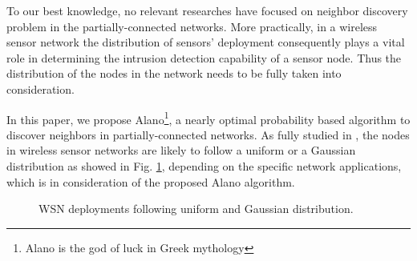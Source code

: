 To our best knowledge, no relevant researches have focused on neighbor discovery problem
in the partially-connected networks. More practically, in a wireless sensor network the distribution of 
sensors' deployment consequently plays a vital role in determining the intrusion detection capability of a sensor node.
Thus the distribution of the nodes in the network needs to be fully taken into 
consideration.

In this paper, we propose Alano\footnote{Alano is the god of luck in Greek mythology }, 
a nearly optimal probability based algorithm to discover neighbors in partially-connected networks. 
As fully studied in \cite{wang2013gaussian} , the nodes in wireless sensor networks are likely to 
follow a uniform or a Gaussian distribution as showed in Fig. \ref{distribution}, 
depending on the specific network applications, which is  in consideration of the proposed Alano algorithm.

 
 \begin{figure}[!t]
\centering
{}
\vspace{0.03in}
\caption{WSN deployments following uniform and Gaussian distribution.}
\label{distribution}
\end{figure}


